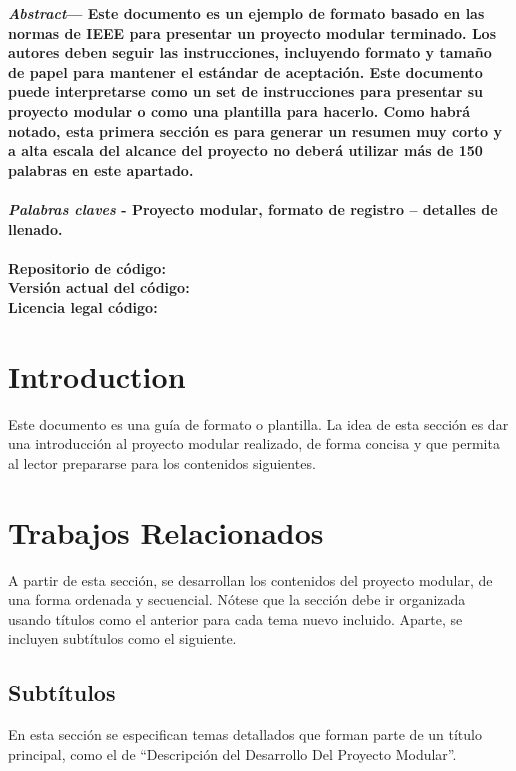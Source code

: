 \documentclass[10pt,twocolumn,letterpaper]{article}
\begin{document}
\restoregeometry %
\twocolumn
\maketitle

\noindent\textbf{\textit{Abstract}— Este documento es un ejemplo de formato basado en las normas de IEEE para presentar un proyecto modular terminado. Los autores deben seguir las instrucciones, incluyendo formato y tamaño de papel para mantener el estándar de aceptación. Este documento puede interpretarse como un set de instrucciones para presentar su proyecto modular o como una plantilla para hacerlo. Como habrá notado, esta primera sección es para generar un resumen muy corto y a alta escala del alcance del proyecto no deberá utilizar más de 150 palabras en este apartado.\\
	\\
	\textit{Palabras claves} - Proyecto modular, formato de registro – detalles de llenado.\\
	\\
	Repositorio de código:\\
	Versión actual del código:\\
	Licencia legal código:
}

\section{Introduction}
Este documento es una guía de formato o plantilla. La idea de esta sección es dar una introducción al proyecto modular realizado, de forma concisa y que permita al lector prepararse para los contenidos siguientes.

\section{Trabajos Relacionados}
A partir de esta sección, se desarrollan los contenidos del proyecto modular, de una forma ordenada y secuencial. Nótese que la sección debe ir organizada usando títulos como el anterior para cada tema nuevo incluido. Aparte, se incluyen subtítulos como el siguiente.

\subsection{Subtítulos}
En esta sección se especifican temas detallados que forman parte de un título principal, como el de “Descripción del Desarrollo Del Proyecto Modular”.
\end{document}
